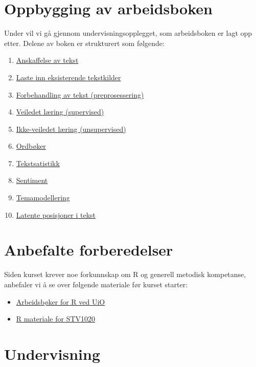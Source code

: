 \documentclass[
]{book}
\providecommand{\tightlist}{%
  \setlength{\itemsep}{0pt}\setlength{\parskip}{0pt}}
\begin{document}
\hypertarget{oppbygging-av-arbeidsboken}{%
\chapter{Oppbygging av arbeidsboken}\label{oppbygging-av-arbeidsboken}}

Under vil vi gå gjennom undervisningsopplegget, som arbeidsboken er lagt opp etter. Delene av boken er strukturert som følgende:

\begin{enumerate}
\def\labelenumi{\arabic{enumi}.}
\tightlist
\item
  \protect\hyperlink{anskaff}{Anskaffelse av tekst}
\item
  \protect\hyperlink{lastetekst}{Laste inn eksisterende tekstkilder}
\item
  \protect\hyperlink{prepros}{Forbehandling av tekst (preprosessering)}
\item
  \protect\hyperlink{sup}{Veiledet læring (supervised)}
\item
  \protect\hyperlink{unsup}{Ikke-veiledet læring (unsupervised)}
\item
  \protect\hyperlink{ordboker}{Ordbøker}
\item
  \protect\hyperlink{tekststats}{Tekstsatistikk}
\item
  \protect\hyperlink{sentiment}{Sentiment}
\item
  \protect\hyperlink{topicmod}{Temamodellering}
\item
  \protect\hyperlink{posisjon}{Latente posisjoner i tekst}
\end{enumerate}

\hypertarget{anbefalte-forberedelser}{%
\chapter{Anbefalte forberedelser}\label{anbefalte-forberedelser}}

Siden kurset krever noe forkunnskap om R og generell metodisk kompetanse, anbefaler vi å se over følgende materiale før kurset starter:

\begin{itemize}
\tightlist
\item
  \href{https://shinyibv02.uio.no/connect/\#/apps/55/access}{Arbeidsbøker for R ved UiO}
\item
  \href{https://github.com/liserodland/STV1020}{R materiale for STV1020}
\end{itemize}

\hypertarget{undervisning}{%
\chapter{Undervisning}\label{undervisning}}
\end{document}

